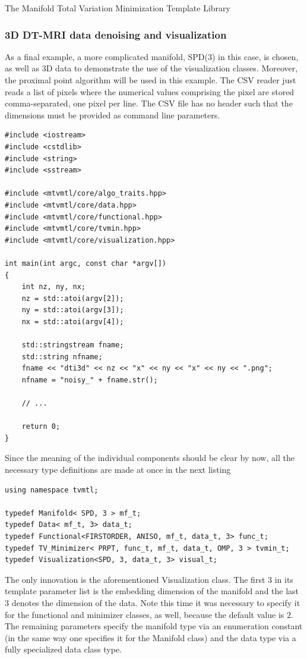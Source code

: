 \begin{chapter}{The Manifold Total Variation Minimization Template Library}
\subsubsection{3D DT-MRI data denoising and visualization} %
\label{ssub:dti_tut}
As a final example, a more complicated manifold, SPD(3) in this case, is chosen, as well as 3D data to demonstrate the use of the visualization classes. Moreover, the proximal point algorithm will be used in this example. The CSV reader just reads a list of pixels where the numerical values comprising the pixel are stored comma-separated, one pixel
per line. The CSV file has no header such that the dimensions must be provided as command line parameters.

\cppinline
\begin{lstlisting}[label=code:tut3_init,caption={Initialization}]
#include <iostream>
#include <cstdlib>
#include <string>
#include <sstream>

#include <mtvmtl/core/algo_traits.hpp>
#include <mtvmtl/core/data.hpp>
#include <mtvmtl/core/functional.hpp>
#include <mtvmtl/core/tvmin.hpp>
#include <mtvmtl/core/visualization.hpp>

int main(int argc, const char *argv[])
{       
    int nz, ny, nx;
    nz = std::atoi(argv[2]);
    ny = std::atoi(argv[3]);
    nx = std::atoi(argv[4]);

    std::stringstream fname;
    std::string nfname;
    fname << "dti3d" << nz << "x" << ny << "x" << ny << ".png";
    nfname = "noisy_" + fname.str();
    
    // ...

    return 0;    
}
\end{lstlisting}
	
Since the meaning of the individual components should be clear by now, all the necessary type definitions 
are made at once in the next listing\\
\cppinline
\begin{lstlisting}[label=code:tut3_typdefinitions,caption={Type definitions, Visualization type}]
using namespace tvmtl;

typedef Manifold< SPD, 3 > mf_t;
typedef Data< mf_t, 3> data_t;
typedef Functional<FIRSTORDER, ANISO, mf_t, data_t, 3> func_t;
typedef TV_Minimizer< PRPT, func_t, mf_t, data_t, OMP, 3 > tvmin_t;
typedef Visualization<SPD, 3, data_t, 3> visual_t;
\end{lstlisting}

The only innovation is the aforementioned Visualization class. The first $3$ in its template parameter list is the embedding dimension of the manifold 
and the last $3$ denotes the dimension of the data. Note this time it was necessary to specify it for the functional and minimizer classes, as well, because the default value is $2$. 
The remaining parameters specify the manifold type via an enumeration constant (in the same way one specifies it for the Manifold class) and the data type via a fully
specialized data class type.\\


\end{chapter}
